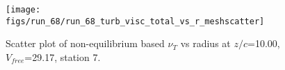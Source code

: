 \begin{figure}[H]
\centering
\texttt{[image: figs/run\_68/run\_68\_turb\_visc\_total\_vs\_r\_meshscatter]}
\caption{Scatter plot of non-equilibrium based $\nu_T$ vs radius at $z/c$=10.00, $V_{free}$=29.17, station 7.}
\label{fig:run_68_turb_visc_total_vs_r_meshscatter}
\end{figure}


